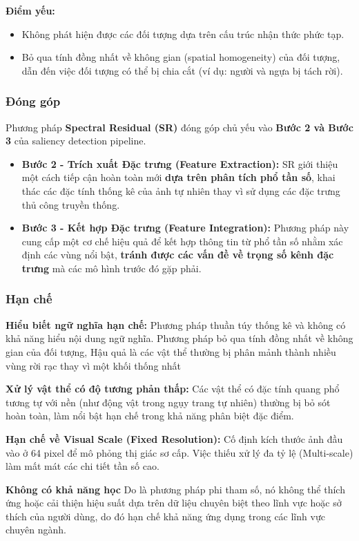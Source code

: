 \textbf{Điểm yếu:} 
\begin{itemize}
    \item Không phát hiện được các đối tượng dựa trên cấu trúc nhận thức phức tạp.
    \item Bỏ qua tính đồng nhất về không gian (spatial homogeneity) của đối tượng, dẫn đến việc đối tượng có thể bị chia cắt (ví dụ: người và ngựa bị tách rời).
\end{itemize}
\subsubsection{Đóng góp}

Phương pháp \textbf{Spectral Residual (SR)} đóng góp chủ yếu vào \textbf{Bước 2 và Bước 3} của saliency detection pipeline.
\begin{itemize}
    \item \textbf{Bước 2 - Trích xuất Đặc trưng (Feature Extraction):} SR giới thiệu một cách tiếp cận hoàn toàn mới \textbf{dựa trên phân tích phổ tần số}, khai thác các đặc tính thống kê của ảnh tự nhiên thay vì sử dụng các đặc trưng thủ công truyền thống.
    \item \textbf{Bước 3 - Kết hợp Đặc trưng (Feature Integration):} Phương pháp này cung cấp một cơ chế hiệu quả để kết hợp thông tin từ phổ tần số nhằm xác định các vùng nổi bật, \textbf{tránh được các vấn đề về trọng số kênh đặc trưng} mà các mô hình trước đó gặp phải.
\end{itemize}

\subsubsection{Hạn chế}
\textbf{Hiểu biết ngữ nghĩa hạn chế:} Phương pháp thuần túy thống kê và không có khả năng hiểu nội dung ngữ nghĩa. Phương pháp bỏ qua tính đồng nhất về không gian của đối tượng, Hậu quả là các vật thể thường bị phân mảnh thành nhiều vùng rời rạc thay vì một khối thống nhất

\textbf{Xử lý vật thể có độ tương phản thấp:} Các vật thể có đặc tính quang phổ tương tự với nền (như động vật trong ngụy trang tự nhiên) thường bị bỏ sót hoàn toàn, làm nổi bật hạn chế trong khả năng phân biệt đặc điểm.

\textbf{Hạn chế về Visual Scale (Fixed Resolution):} Cố định kích thước ảnh đầu vào ở 64 pixel để mô phỏng thị giác sơ cấp. Việc thiếu xử lý đa tỷ lệ (Multi-scale) làm mất mát các chi tiết tần số cao.

\textbf{Không có khả năng học} Do là phương pháp phi tham số, nó không thể thích ứng hoặc cải thiện hiệu suất dựa trên dữ liệu chuyên biệt theo lĩnh vực hoặc sở thích của người dùng, do đó hạn chế khả năng ứng dụng trong các lĩnh vực chuyên ngành.

